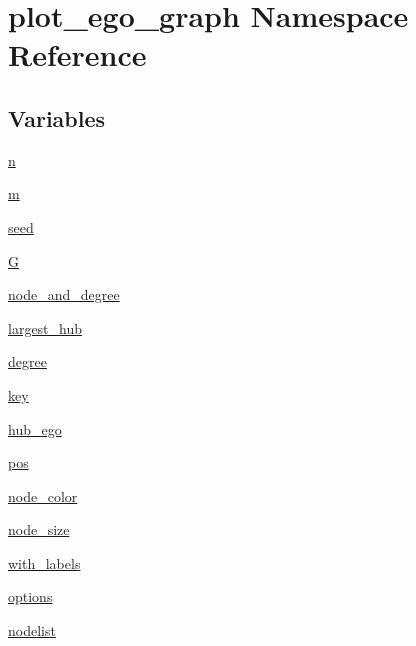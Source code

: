\hypertarget{namespaceplot__ego__graph}{}\section{plot\+\_\+ego\+\_\+graph Namespace Reference}
\label{namespaceplot__ego__graph}
\subsection*{Variables}
\begin{DoxyCompactItemize}
\item 
\hyperlink{namespaceplot__ego__graph_a88c2cae7c0dc42ce4cdfa6baae738b62}{n}
\item 
\hyperlink{namespaceplot__ego__graph_a872dc5c64922bd7f7c69331c8b9fcb69}{m}
\item 
\hyperlink{namespaceplot__ego__graph_a2df9ba14359fb213813c5c2f7eebeec5}{seed}
\item 
\hyperlink{namespaceplot__ego__graph_affaf121f892e4190aef8936b2f35cadc}{G}
\item 
\hyperlink{namespaceplot__ego__graph_a40bef56e4b67c00bf246a036ad76c09b}{node\+\_\+and\+\_\+degree}
\item 
\hyperlink{namespaceplot__ego__graph_a3a51f1890e95fdd8c298a4eec454a121}{largest\+\_\+hub}
\item 
\hyperlink{namespaceplot__ego__graph_ae5a2fd3dfa90d6d65586b3e49f76e5ec}{degree}
\item 
\hyperlink{namespaceplot__ego__graph_a5630de12afcd27adfd4fead939e02ec1}{key}
\item 
\hyperlink{namespaceplot__ego__graph_ad818ca41d3408c5c653eb30871d72dc3}{hub\+\_\+ego}
\item 
\hyperlink{namespaceplot__ego__graph_ae0e39e5ffd4a297388c6b50154591da9}{pos}
\item 
\hyperlink{namespaceplot__ego__graph_a8d6f84eb24bd440a97e3b52b5afe806d}{node\+\_\+color}
\item 
\hyperlink{namespaceplot__ego__graph_a4dde10f56e3fdd212f46c078ffef1e33}{node\+\_\+size}
\item 
\hyperlink{namespaceplot__ego__graph_a4be6e308992404a7bc1aec078419da65}{with\+\_\+labels}
\item 
\hyperlink{namespaceplot__ego__graph_a064d05b5a04119d318016fd4febe79da}{options}
\item 
\hyperlink{namespaceplot__ego__graph_a1db3f7baeb9acff8cc325409ac4c63d2}{nodelist}
\end{DoxyCompactItemize}


